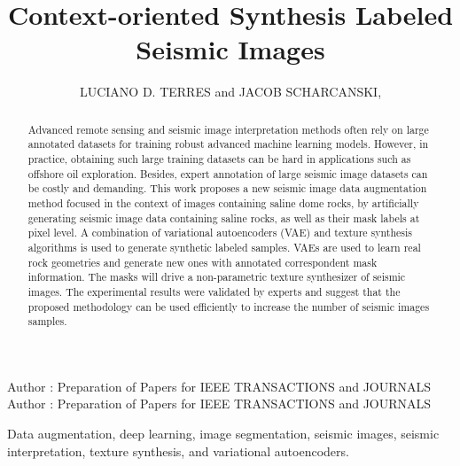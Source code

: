 \documentclass{ieeeaccess}
\providecommand{\DIFadd}[1]{{\protect\color{blue}\uwave{#1}}} %
\providecommand{\DIFaddbegin}{} %
\providecommand{\DIFaddend}{} %
\newcommand{\DIFaddincludegraphics}[2][]{{\color{blue}\fbox{\DIFOincludegraphics[#1]{#2}}}} %
\DeclareRobustCommand{\DIFaddbegin}{\DIFOaddbegin \let\includegraphics\DIFaddincludegraphics} %
\DeclareRobustCommand{\DIFaddend}{\DIFOaddend \let\includegraphics\DIFOincludegraphics} %
\begin{document}

\title{Context-oriented Synthesis \DIFaddbegin \DIFadd{of Salt Domes in }\DIFaddend Labeled Seismic Images}
\author{\uppercase{Luciano D. Terres} and
\uppercase{Jacob Scharcanski},  }

\address[1]{Institute of Informatics,
Federal University of Rio Grande do Sul, Porto Alegre, RS, Brasil, 91501-970, e-mail: ldterres@inf.ufrgs.br}
\address[2]{Institute of Informatics, 
Federal University of Rio Grande do Sul, Porto Alegre, RS, Brasil, 91501-970, e-mail: jacobs@inf.ufrgs.br}

\markboth
{Author \headeretal: Preparation of Papers for IEEE TRANSACTIONS and JOURNALS}
{Author \headeretal: Preparation of Papers for IEEE TRANSACTIONS and JOURNALS}



\begin{abstract}
Advanced remote sensing and seismic image interpretation methods often rely on large annotated datasets for training robust advanced machine learning models. However, in practice, obtaining such large training datasets can be hard in applications such as offshore oil exploration. Besides, expert annotation of large seismic image datasets can be costly and demanding. This work proposes a new seismic image data augmentation method focused in the context of images containing saline dome rocks, by artificially generating seismic image data containing saline rocks, as well as their mask labels at pixel level. A combination of variational autoencoders (VAE) and texture synthesis algorithms is used to generate synthetic labeled samples. VAEs are used to learn real rock geometries and generate new ones with annotated correspondent mask information. The masks will drive a non-parametric texture synthesizer of seismic images. The experimental results were validated by experts and suggest that the proposed methodology can be used efficiently to increase the number of seismic images samples. 
\end{abstract}

\begin{keywords}
Data augmentation, deep learning, image segmentation, seismic images, seismic interpretation, texture synthesis, and variational autoencoders.
\end{keywords}
\end{document}
